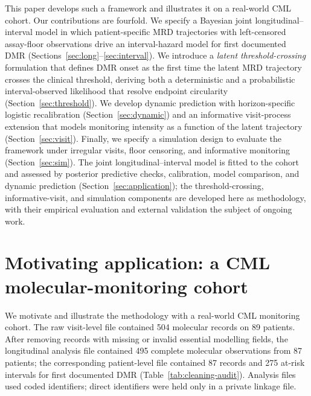 \documentclass[11pt]{article}
\begin{document}
This paper develops such a framework and illustrates it on a real-world
CML cohort. Our contributions are fourfold. We specify a Bayesian joint
longitudinal--interval model in which patient-specific MRD trajectories
with left-censored assay-floor observations drive an interval-hazard model
for first documented DMR (Sections~\ref{sec:long}--\ref{sec:interval}). We
introduce a \emph{latent threshold-crossing} formulation that defines DMR
onset as the first time the latent MRD trajectory crosses the clinical
threshold, deriving both a deterministic and a probabilistic
interval-observed likelihood that resolve endpoint circularity
(Section~\ref{sec:threshold}). We develop dynamic prediction with
horizon-specific logistic recalibration
(Section~\ref{sec:dynamic}) and an informative visit-process extension
that models monitoring intensity as a function of the latent trajectory
(Section~\ref{sec:visit}). Finally, we specify a simulation design to
evaluate the framework under irregular visits, floor censoring, and
informative monitoring (Section~\ref{sec:sim}). The joint
longitudinal--interval model is fitted to the cohort and assessed by
posterior predictive checks, calibration, model comparison, and dynamic
prediction (Section~\ref{sec:application}); the threshold-crossing,
informative-visit, and simulation components are developed here as
methodology, with their empirical evaluation and external validation the
subject of ongoing work.

\section{Motivating application: a CML molecular-monitoring cohort}
\label{sec:motivating}

We motivate and illustrate the methodology with a real-world CML
monitoring cohort. The raw visit-level file contained 504 molecular
records on 89 patients. After removing records with missing or invalid
essential modelling fields, the longitudinal analysis file contained 495
complete molecular observations from 87 patients; the corresponding
patient-level file contained 87 records and 275 at-risk intervals for
first documented DMR (Table~\ref{tab:cleaning-audit}). Analysis files used coded
identifiers; direct identifiers were held only in a private linkage file.


\end{document}
